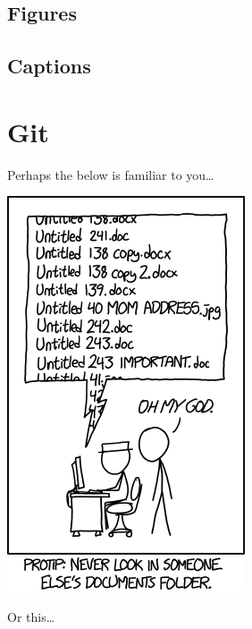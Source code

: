 \documentclass[
]{book}
\begin{document}
\hypertarget{figures}{%
\section{Figures}\label{figures}}

\hypertarget{captions}{%
\section{Captions}\label{captions}}

\hypertarget{git}{%
\chapter{Git}\label{git}}

Perhaps the below is familiar to you\ldots{}

\includegraphics{img/version_control.png}

Or this\ldots{}
\end{document}
